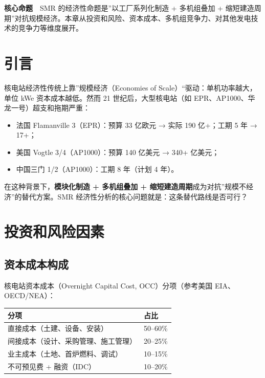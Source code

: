 \documentclass[
  UTF8,
  scheme=plain,
  fontsize=10pt,
  openany
]{ctexbook}
\begin{document}
\begin{epigraph}

\textbf{核心命题}　SMR 的经济性命题是''以工厂系列化制造 + 多机组叠加 +
缩短建造周期''对抗规模经济。本章从投资和风险、资本成本、多机组竞争力、对其他发电技术的竞争力等维度展开。

\end{epigraph}

\section{引言}\label{ux5f15ux8a00-9}

核电站经济性传统上靠''规模经济（Economies of
Scale）``驱动：单机功率越大，单位 kWe 资本成本越低。然而 21
世纪后，大型核电站（如 EPR、AP1000、华龙一号）超支和拖期严重：

\begin{itemize}
\tightlist
\item
  法国 Flamanville 3（EPR）：预算 33 亿欧元 → 实际 190 亿+；工期 5 年 →
  17+；
\item
  美国 Vogtle 3/4（AP1000）：预算 140 亿美元 → 340+ 亿美元；
\item
  中国三门 1/2（AP1000）：工期 8 年（计划 4 年）。
\end{itemize}

在这种背景下，\textbf{模块化制造 + 多机组叠加 +
缩短建造周期}成为对抗''规模不经济''的替代方案。SMR
经济性分析的核心问题就是：这条替代路线是否可行？

\section{投资和风险因素}\label{ux6295ux8d44ux548cux98ceux9669ux56e0ux7d20}

\subsection{资本成本构成}\label{ux8d44ux672cux6210ux672cux6784ux6210-1}

核电站资本成本（Overnight Capital Cost, OCC）分项（参考美国
EIA、OECD/NEA）：

{\def\LTcaptype{none} %
\begin{longtable}[]{@{}ll@{}}
\toprule\noalign{}
分项 & 占比 \\
\midrule\noalign{}
\endhead
\bottomrule\noalign{}
\endlastfoot
直接成本（土建、设备、安装） & 50--60\% \\
间接成本（设计、采购管理、施工管理） & 20--25\% \\
业主成本（土地、首炉燃料、调试） & 10--15\% \\
不可预见费 + 融资（IDC） & 10--20\% \\
\end{longtable}
}
\end{document}
